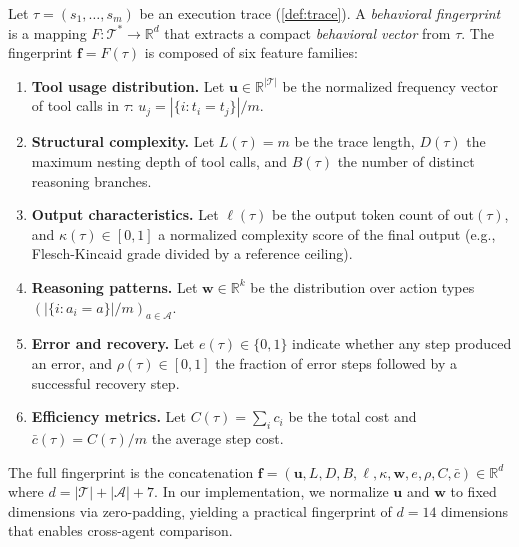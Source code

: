 \begin{definition}
\label{def:fingerprint}
Let $\tau = (s_1, \ldots, s_m)$ be an execution trace
(\cref{def:trace}). A \emph{behavioral fingerprint} is a mapping
$F: \mathcal{T}^* \to \mathbb{R}^d$ that extracts a compact
\emph{behavioral vector} from $\tau$. The fingerprint $\mathbf{f} =
F(\tau)$ is composed of six feature families:

\begin{enumerate}[leftmargin=*]
  \item \textbf{Tool usage distribution.} Let $\mathbf{u} \in
    \mathbb{R}^{|\mathcal{T}|}$ be the normalized frequency vector of
    tool calls in $\tau$: $u_j = |\{i : t_i = t_j\}| / m$.

  \item \textbf{Structural complexity.} Let $L(\tau) = m$ be the trace
    length, $D(\tau)$ the maximum nesting depth of tool calls, and
    $B(\tau)$ the number of distinct reasoning branches.

  \item \textbf{Output characteristics.} Let $\ell(\tau)$ be the output
    token count of $\mathrm{out}(\tau)$, and $\kappa(\tau) \in [0,1]$ a
    normalized complexity score of the final output (e.g., Flesch-Kincaid
    grade divided by a reference ceiling).

  \item \textbf{Reasoning patterns.} Let $\mathbf{w} \in \mathbb{R}^k$
    be the distribution over action types $(|\{i : a_i = a\}| / m)_{a
    \in \mathcal{A}}$.

  \item \textbf{Error and recovery.} Let $e(\tau) \in \{0,1\}$ indicate
    whether any step produced an error, and $\rho(\tau) \in [0,1]$ the
    fraction of error steps followed by a successful recovery step.

  \item \textbf{Efficiency metrics.} Let $C(\tau) = \sum_i c_i$ be the
    total cost and $\bar{c}(\tau) = C(\tau)/m$ the average step cost.
\end{enumerate}

The full fingerprint is the concatenation $\mathbf{f} = (\mathbf{u},
L, D, B, \ell, \kappa, \mathbf{w}, e, \rho, C, \bar{c}) \in
\mathbb{R}^d$ where $d = |\mathcal{T}| + |\mathcal{A}| + 7$. In our
implementation, we normalize $\mathbf{u}$ and $\mathbf{w}$ to fixed
dimensions via zero-padding, yielding a practical fingerprint of
$d = 14$ dimensions that enables cross-agent comparison.
\end{definition}

